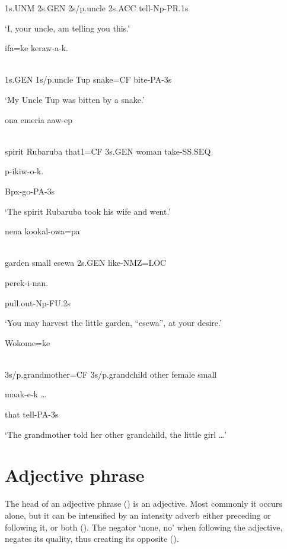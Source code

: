1s.UNM  2s.GEN  2s/p.uncle  2s.ACC  tell-Np-PR.1s

`I, your uncle, am telling you this.'

\ea%
\label{ex:x836}
\gll {}  ifa=ke  keraw-a-k. \\
      \\
\glt
\z

1s.GEN  1s/p.uncle  Tup  snake=CF  bite-PA-3s

`My Uncle Tup was bitten by a snake.'

\ea%
\label{ex:x837}
\gll {}    ona  emeria  aaw-ep  \\
      \\
\glt
\z

spirit  Rubaruba  that1=CF  3s.GEN  woman  take-SS.SEQ  

p-ikiw-o-k.

Bpx-go-PA-3s

`The spirit Rubaruba took his wife and went.'

\ea%
\label{ex:x838}
\gll {}    nena  kookal-owa=pa  \\
      \\
\glt
\z

garden  small  esewa  2s.GEN  like-NMZ=LOC  

perek-i-nan.

pull.out-Np-FU.2s

`You may harvest the little garden, ``esewa'', at your desire.'

\ea%
\label{ex:x839}
\gll Wokome=ke   \\
      \\
\glt
\z

3s/p.grandmother=CF  3s/p.grandchild  other  female  small  

  maak-e-k  {\dots}

that  tell-PA-3s

`The grandmother told her other grandchild, the little girl {\dots}'

\section{Adjective phrase}
{}
The head of an adjective phrase () is an adjective. Most commonly it occurs alone, but it can be intensified by an intensity adverb either preceding or following it, or both ().  The negator  `none, no' when following the adjective, negates its quality, thus creating its opposite ().  

